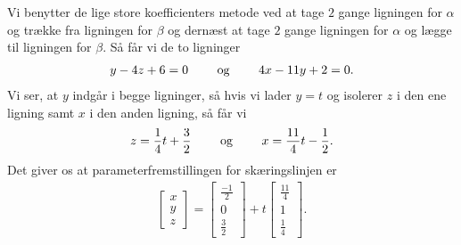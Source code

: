 \begin{enumerate}
Vi benytter de lige store koefficienters metode ved at tage $2$ gange ligningen for $\alpha$ og trække fra ligningen for $\beta$ og dernæst at tage $2$ gange ligningen for $\alpha$ og lægge til ligningen for $\beta$. Så får vi de to ligninger
\begin{align*}
y -4z + 6 = 0 \qquad \textup{ og } \qquad 4x - 11y + 2 = 0.
\end{align*}
Vi ser, at $y$ indgår i begge ligninger, så hvis vi lader $y=t$ og isolerer $z$ i den ene ligning samt $x$ i den anden ligning, så får vi
\begin{align*}
z = \frac{1}{4}t + \frac{3}{2} \qquad \textup{ og } \qquad x = \frac{11}{4}t - \frac{1}{2}.
\end{align*}
Det giver os at parameterfremstillingen for skæringslinjen er
\begin{align*}
\begin{bmatrix}x \\ y \\ z\end{bmatrix} = \begin{bmatrix} \frac{-1}{2} \\ 0 \\ \frac{3}{2} \end{bmatrix} + t \begin{bmatrix} \frac{11}{4} \\ 1 \\ \frac{1}{4} \end{bmatrix}.
\end{align*}
\end{enumerate}












